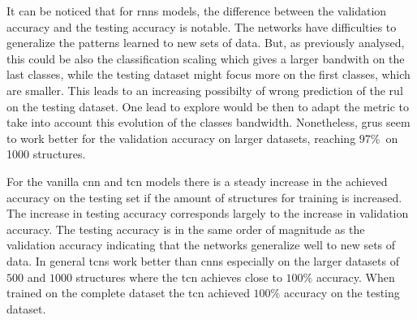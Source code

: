 \documentclass[conference]{IEEEtran}
\begin{document}
It can be noticed that for \glspl{rnn} models, the difference between the validation accuracy and the testing accuracy is notable. The networks have difficulties to generalize the patterns learned to new sets of data. But, as previously analysed, this could be also the classification scaling which gives a larger bandwith on the last classes, while the testing dataset might focus more on the first classes, which are smaller. This leads to an increasing possibilty of wrong prediction of the \gls{rul} on the testing dataset. One lead to explore would be then to adapt the metric to take into account this evolution of the classes bandwidth. Nonetheless, \glspl{gru} seem to work better for the validation accuracy on larger datasets, reaching 97\%\ on 1000 structures.

For the vanilla \gls{cnn} and \gls{tcn} models there is a steady increase in the achieved accuracy on the testing set if the amount of structures for training is increased. The increase in testing accuracy corresponds largely to the increase in validation accuracy. The testing accuracy is in the same order of magnitude as the validation accuracy indicating that the networks generalize well to new sets of data. In general \glspl{tcn} work better than \glspl{cnn} especially on the larger datasets of $ 500 $ and $ 1000 $ structures where the \gls{tcn} achieves close to $ 100 \% $ accuracy. When trained on the complete dataset the \gls{tcn} achieved $ 100 \% $ accuracy on the testing dataset.

\end{document}
